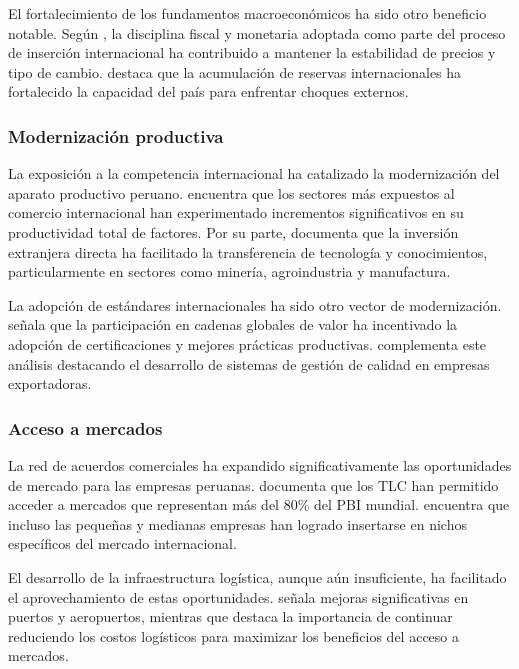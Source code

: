 \documentclass[12pt, a4paper]{article}
\begin{document}
El fortalecimiento de los fundamentos macroeconómicos ha sido otro beneficio notable. Según \textcite{velarde2019politica}, la disciplina fiscal y monetaria adoptada como parte del proceso de inserción internacional ha contribuido a mantener la estabilidad de precios y tipo de cambio. \textcite{pastor2021reservas} destaca que la acumulación de reservas internacionales ha fortalecido la capacidad del país para enfrentar choques externos.

\subsubsection{Modernización productiva}
La exposición a la competencia internacional ha catalizado la modernización del aparato productivo peruano. \textcite{tello2019productividad} encuentra que los sectores más expuestos al comercio internacional han experimentado incrementos significativos en su productividad total de factores. Por su parte, \textcite{garcia2020innovacion} documenta que la inversión extranjera directa ha facilitado la transferencia de tecnología y conocimientos, particularmente en sectores como minería, agroindustria y manufactura.

La adopción de estándares internacionales ha sido otro vector de modernización. \textcite{kuramoto2018cadenas} señala que la participación en cadenas globales de valor ha incentivado la adopción de certificaciones y mejores prácticas productivas. \textcite{távara2021calidad} complementa este análisis destacando el desarrollo de sistemas de gestión de calidad en empresas exportadoras.

\subsubsection{Acceso a mercados}
La red de acuerdos comerciales ha expandido significativamente las oportunidades de mercado para las empresas peruanas. \textcite{ferrero2019tlc} documenta que los TLC han permitido acceder a mercados que representan más del 80\% del PBI mundial. \textcite{malca2020pymes} encuentra que incluso las pequeñas y medianas empresas han logrado insertarse en nichos específicos del mercado internacional.

El desarrollo de la infraestructura logística, aunque aún insuficiente, ha facilitado el aprovechamiento de estas oportunidades. \textcite{bonifaz2021infraestructura} señala mejoras significativas en puertos y aeropuertos, mientras que \textcite{rosales2019conectividad} destaca la importancia de continuar reduciendo los costos logísticos para maximizar los beneficios del acceso a mercados.
\end{document}
